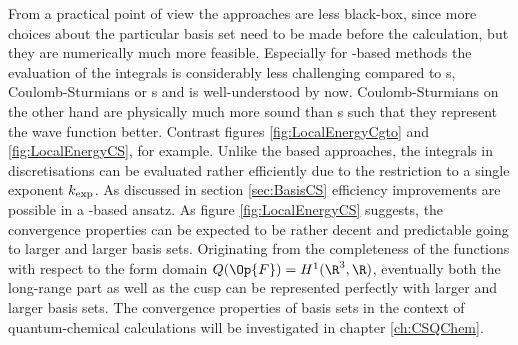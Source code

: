 From a practical point of view
the \AO approaches are less black-box,
since more choices about the particular basis set need to be made before the calculation,
but they are numerically much more feasible.
Especially for \cGTO-based methods the evaluation of the integrals
is considerably less challenging compared to {\STO}s, Coulomb-Sturmians
or {\FE}s and is well-understood by now.
Coulomb-Sturmians on the other hand are physically much more sound than
{\cGTO}s such that they represent the wave function better.
Contrast figures \vref{fig:LocalEnergyCgto} and \vref{fig:LocalEnergyCS}, for example.
Unlike the \STO based approaches,
the integrals in \CS discretisations can be evaluated rather efficiently
due to the restriction to a single exponent $k_\text{exp}$.
As discussed in section \vref{sec:BasisCS}
efficiency improvements are possible
in a \contraction-based ansatz.
As figure \ref{fig:LocalEnergyCS} suggests, the convergence properties
can be expected to be rather decent and predictable
going to larger and larger basis sets.
Originating from the completeness of the \CS functions
with respect to the form domain $Q(\Op{F}) = H^1(\R^3,\R)$,
eventually both the long-range part as well as the cusp can be represented
perfectly with larger and larger basis sets.
The convergence properties of \CS basis sets in the context of
quantum-chemical calculations will be investigated
in chapter \vref{ch:CSQChem}.
